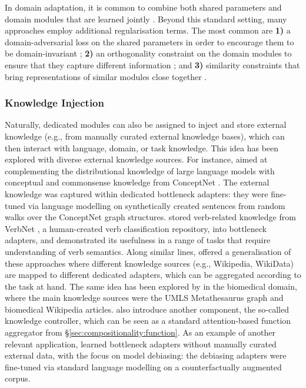 \documentclass[10pt]{article} %
\begin{document}
In domain adaptation, it is common to combine both shared parameters and domain modules that are learned jointly \citep{Bousmalis2016}. Beyond this standard setting, many approaches employ additional regularisation terms. The most common are \textbf{1)} a domain-adversarial loss on the shared parameters in order to encourage them to be domain-invariant \citep{ganin2016domain,chen-cardie-2018-multinomial}; \textbf{2)} an orthogonality constraint on the domain modules to ensure that they capture different information \citep{baktashmotlagh2013unsupervised,kim-etal-2017-adversarial}; and \textbf{3)} similarity constraints that bring representations of similar modules close together \citep{Bousmalis2016}.

 

\subsubsection{Knowledge Injection}
\label{ss:knowledge_injection}
Naturally, dedicated modules can also be assigned to inject and store external knowledge (e.g., from manually curated external knowledge bases), which can then interact with language, domain, or task knowledge. This idea has been explored with diverse external knowledge sources. For instance, \citet{lauscher-etal-2020-common} aimed at complementing the distributional knowledge of large language models with conceptual and commonsense knowledge from ConceptNet \citep{Speer:2017conceptnet}. The external knowledge was captured within dedicated bottleneck adapters: they were fine-tuned via language modelling on synthetically created sentences from random walks over the ConceptNet graph structures. \cite{majewska-etal-2021-verb} stored verb-related knowledge from VerbNet \citep{schuler2005verbnet}, a human-created verb classification repository, into bottleneck adapters, and demonstrated its usefulness in a range of tasks that require understanding of verb semantics. Along similar lines, \citet{wang-etal-2021-k} offered a generalisation of these approaches where different knowledge sources (e.g., Wikipedia, WikiData) are mapped to different dedicated adapters, which can be aggregated according to the task at hand. The same idea has been explored by \citet{Lu:2021knowledge} in the biomedical domain, where the main knowledge sources were the UMLS Metathesaurus graph \citep{bodenreider2004unified} and biomedical Wikipedia articles. \citet{Lu:2021knowledge} also introduce another component, the so-called knowledge controller, which can be seen as a standard attention-based function aggregator from \S\ref{sec:compositionality:function}. As an example of another relevant application, \citet{lauscher-etal-2021-sustainable-modular} learned bottleneck adapters without manually curated external data, with the focus on model debiasing: the debiasing adapters were fine-tuned via standard language modelling on a counterfactually augmented corpus. 
\end{document}

